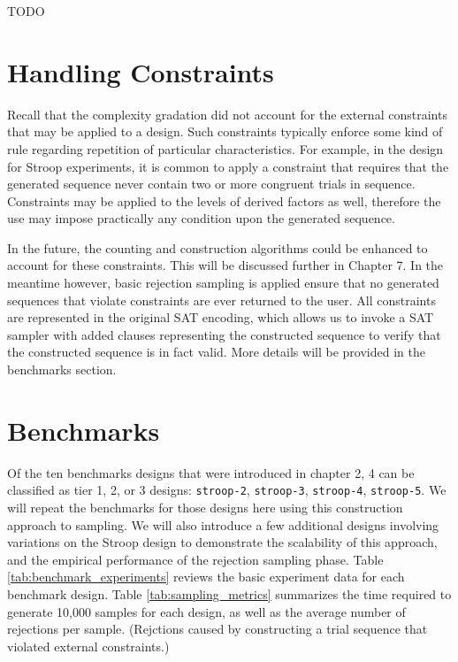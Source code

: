 TODO

\section{Handling Constraints}


Recall that the complexity gradation did not account for the external constraints that may be applied to a design. Such constraints typically enforce some kind of rule regarding repetition of particular characteristics. For example, in the design for Stroop experiments, it is common to apply a constraint that requires that the generated sequence never contain two or more congruent trials in sequence. Constraints may be applied to the levels of derived factors as well, therefore the use may impose practically any condition upon the generated sequence.

In the future, the counting and construction algorithms could be enhanced to account for these constraints. This will be discussed further in Chapter 7. In the meantime however, basic rejection sampling is applied ensure that no generated sequences that violate constraints are ever returned to the user. All constraints are represented in the original SAT encoding, which allows us to invoke a SAT sampler with added clauses representing the constructed sequence to verify that the constructed sequence is in fact valid. More details will be provided in the benchmarks section.


\section{Benchmarks}


Of the ten benchmarks designs that were introduced in chapter 2, 4 can be classified as tier 1, 2, or 3 designs: \texttt{stroop-2}, \texttt{stroop-3}, \texttt{stroop-4}, \texttt{stroop-5}. We will repeat the benchmarks for those designs here using this construction approach to sampling. We will also introduce a few additional designs involving variations on the Stroop design to demonstrate the scalability of this approach, and the empirical performance of the rejection sampling phase. Table \ref{tab:benchmark_experiments} reviews the basic experiment data for each benchmark design. Table \ref{tab:sampling_metrics} summarizes the time required to generate 10,000 samples for each design, as well as the average number of rejections per sample. (Rejctions caused by constructing a trial sequence that violated external constraints.)

